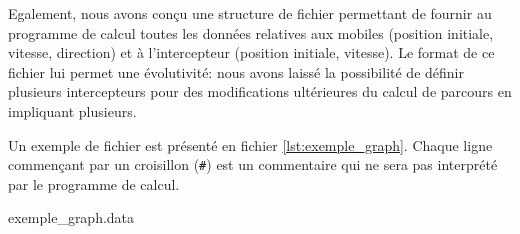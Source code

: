 	Egalement, nous avons conçu une structure de fichier permettant de fournir au programme de calcul toutes les données relatives aux mobiles (position initiale, vitesse, direction) et à l'intercepteur (position initiale, vitesse). Le format de ce fichier lui permet une évolutivité: nous avons laissé la possibilité de définir plusieurs intercepteurs pour des modifications ultérieures du calcul de parcours en impliquant plusieurs.

	Un exemple de fichier est présenté en fichier \ref{lst:exemple_graph}. Chaque ligne commençant par un croisillon (\texttt{\#}) est un commentaire qui ne sera pas interprété par le programme de calcul.

	\begin{listing}[H]
      	\caption{exemple\_graph.data}
      	\label{lst:exemple_graph}
  	\end{listing}